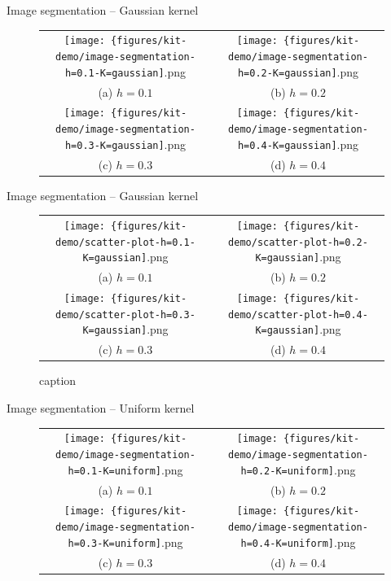 \documentclass[18pt]{beamer}
\begin{document}
\begin{frame}{Image segmentation -- Gaussian kernel}
\tiny
\begin{figure}
	\begin{tabular}{cc}
		\texttt{[image: \{figures/kit-demo/image-segmentation-h=0.1-K=gaussian]}.png} &   \texttt{[image: \{figures/kit-demo/image-segmentation-h=0.2-K=gaussian]}.png} \\
		(a) $h = 0.1$ & (b) $h = 0.2$ \\[6pt]
		\texttt{[image: \{figures/kit-demo/image-segmentation-h=0.3-K=gaussian]}.png} &   \texttt{[image: \{figures/kit-demo/image-segmentation-h=0.4-K=gaussian]}.png} \\
		(c) $h = 0.3$ & (d) $h = 0.4$ \\[6pt]
	\end{tabular}
\end{figure}
\end{frame}


\begin{frame}{Image segmentation -- Gaussian kernel}
\tiny
\begin{figure}
\begin{tabular}{cc}
	\texttt{[image: \{figures/kit-demo/scatter-plot-h=0.1-K=gaussian]}.png} &   \texttt{[image: \{figures/kit-demo/scatter-plot-h=0.2-K=gaussian]}.png} \\
	(a) $h = 0.1$ & (b) $h = 0.2$ \\[6pt]
	\texttt{[image: \{figures/kit-demo/scatter-plot-h=0.3-K=gaussian]}.png} &   \texttt{[image: \{figures/kit-demo/scatter-plot-h=0.4-K=gaussian]}.png} \\
	(c) $h = 0.3$ & (d) $h = 0.4$ \\[6pt]
\end{tabular}
\caption{caption}
\end{figure}
\end{frame}


\begin{frame}{Image segmentation -- Uniform kernel}
\tiny
\begin{figure}
\begin{tabular}{cc}
\texttt{[image: \{figures/kit-demo/image-segmentation-h=0.1-K=uniform]}.png} &   \texttt{[image: \{figures/kit-demo/image-segmentation-h=0.2-K=uniform]}.png} \\
(a) $h = 0.1$ & (b) $h = 0.2$ \\[6pt]
\texttt{[image: \{figures/kit-demo/image-segmentation-h=0.3-K=uniform]}.png} &   \texttt{[image: \{figures/kit-demo/image-segmentation-h=0.4-K=uniform]}.png} \\
(c) $h = 0.3$ & (d) $h = 0.4$ \\[6pt]
\end{tabular}
\end{figure}
\end{frame}
\end{document}

